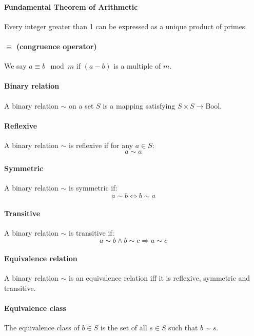 \documentclass{scrartcl}
\begin{document}
\paragraph{Fundamental Theorem of Arithmetic}
Every integer greater than 1 can be expressed as a unique product of primes.

\paragraph{$ \equiv$ (congruence operator)}
We say $ a \equiv b \mod m $ if $ (a - b) $ is a multiple of $ m $.

\paragraph{Binary relation}
A binary relation $ \sim $ on a set $ S $ is a mapping satisfying $ S \times S \to \textrm{Bool} $.

\paragraph{Reflexive}
A binary relation $ \sim $ is reflexive if for any $ a \in S $:
\begin{equation}
a \sim a
\end{equation}

\paragraph{Symmetric}
A binary relation $ \sim $ is symmetric if:
\begin{equation}
a \sim b \Leftrightarrow b \sim a
\end{equation}

\paragraph{Transitive}
A binary relation $ \sim $ is transitive if:
\begin{equation}
a \sim b \land b \sim c \Rightarrow a \sim c
\end{equation}

\paragraph{Equivalence relation}
A binary relation $ \sim $ is an equivalence relation iff it is reflexive, symmetric and transitive.

\paragraph{Equivalence class}
The equivalence class of $ b \in S $ is the set of all $ s \in S $ such that $ b \sim s $.
\end{document}
